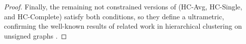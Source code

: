 \begin{proof}
Finally, the remaining not constrained versions of \algname{} (HC-Avg, HC-Single, and HC-Complete) satisfy both conditions, so they define a ultrametric, confirming the well-known results of related work in hierarchical clustering on unsigned graphs \cite{johnson1967hierarchical,milligan1979ultrametric}.







\end{proof}

